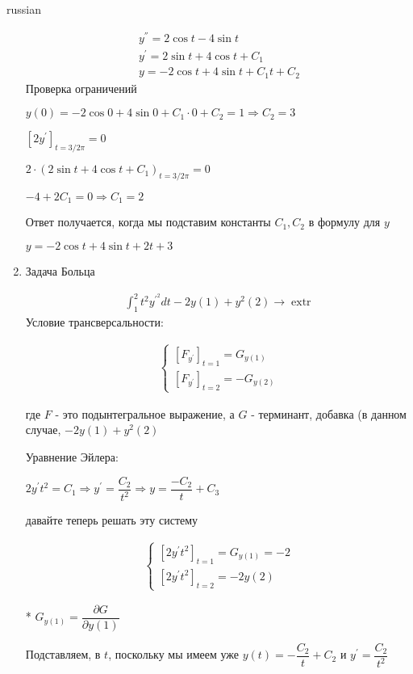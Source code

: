\documentclass{article}
\begin{document}
\begin{otherlanguage*}{russian}
\begin{enumerate}
\begin{align*}
y^{''} = 2 \cos t - 4 \sin t \\ 
y^{'} = 2 \sin t + 4 \cos t + C_1 \\ 
y = - 2 \cos t + 4 \sin t + C_1 t +  C_2  
\end{align*}
Проверка ограничений

$ y(0) = - 2 \cos 0 + 4 \sin 0 + C_1 \cdot 0 + C_2 = 1 \Rightarrow C_2 = 3 $

$ [ 2 y^{'} ]_{t =  3/2 \pi} = 0 $ 

$ 2 \cdot (2 \sin t + 4 \cos t + C_1 )_{t = 3 /2 \pi } = 0 $  

$ -4 + 2 C_1 = 0 \Rightarrow C_1 = 2 $ 

Ответ получается, когда мы подставим константы $ C_1, C_2 $ в формулу для $y$

$ y = -2 \cos t + 4 \sin t + 2 t + 3 $ 

\item Задача Больца 

\begin{align*}
\int_1^2 t^2 y^{'^{2}} dt - 2 y(1) + y^2(2) \rightarrow \operatorname{extr} 
\end{align*}
Условие трансверсальности:

\begin{align*}
\begin{cases}
[F_{y^{'}}]_{t=1} = G_{y(1)} \\
[F_{y^{'}} ]_{t=2} = - G_{y(2)} 
\end{cases}
\end{align*}

где $ F $ - это подынтегральное выражение, а $ G $ - терминант, добавка (в данном случае, $ -2y(1) + y^2(2) $ 

Уравнение Эйлера: 

$ 2y^{'} t^2 = C_1  \Rightarrow y^{'} = \dfrac{C_2}{t^2} \Rightarrow y = \dfrac{-C_2}{t} + C_3$ 

давайте теперь решать эту систему

\begin{align*}
\begin{cases} 
[2y^{'} t ^ 2]_{t=1} = G_{y(1)} = -2 \\
[2y^{'} t^2]_{t=2} = -2 y (2) 
\end{cases} 
\end{align*}

* $ G_{y(1)} = \dfrac{\partial G}{\partial y(1)}$ 

Подставляем, в $ t $, поскольку мы имеем уже $ y(t) = - \dfrac{C_2}{t} + C_2 $ и $ y^{'} = \dfrac{C_2}{t^2} $ 


\end{enumerate}
\end{otherlanguage*}
\end{document}
